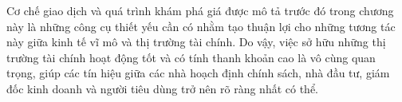 Cơ chế giao dịch và quá trình khám phá giá được mô tả trước đó trong chương này là những công cụ thiết yếu cần có nhằm tạo thuận lợi cho những tương tác này giữa kinh tế vĩ mô và thị trường tài chính. Do vậy, việc sở hữu những thị trường tài chính hoạt động tốt và có tính thanh khoản cao là vô cùng quan trọng, giúp các tín hiệu giữa các nhà hoạch định chính sách, nhà đầu tư, giám đốc kinh doanh và người tiêu dùng trở nên rõ ràng nhất có thể.

